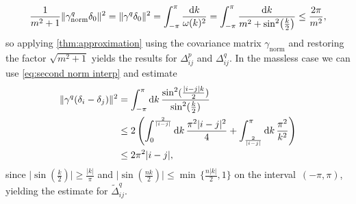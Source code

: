 \documentclass[submission, Phys]{SciPost}
\theoremstyle{definition}
\theoremstyle{remark}
\DeclareMathOperator{\normalized}{norm}
\DeclarePairedDelimiter{\norm}{\lVert}{\rVert}
\renewcommand{\d}{\ensuremath{\mathrm{d}}}
\begin{document}
\begin{appendix}
\begin{equation*}
  \frac1{m^2+1} \norm{\gamma_{\normalized}^q \delta_0}^2 = \norm{\gamma^q \delta_0}^2
= \int_{-\pi}^{\pi}\frac{\d k}{\omega(k)^2}
= \int_{-\pi}^{\pi}\frac{\d k}{m^2 + \sin^2\bigl(\frac{k}{2}\bigr)}
\leq \frac{2\pi}{m^2},
\end{equation*}
so applying \cref{thm:approximation} using the covariance matrix $\gamma_{\normalized}$ and restoring the factor $\sqrt{m^2 + 1}$ yields the results for $\Delta^p_{ij}$ and $\Delta^q_{ij}$.
In the massless case we can use \cref{eq:second norm interp} and estimate
\begin{equation*}\begin{aligned}
\norm{\gamma^q (\delta_i - \delta_j)}^2
&= \int_{-\pi}^{\pi}\d k\, \frac{\sin^2(\frac{\lvert i - j \rvert k}{2})}{\sin^2(\frac{k}{2})} \\
&\leq 2 \left( \int_0^{\frac{2}{\lvert i - j \rvert}} \d k\, \frac{\pi^2 \lvert i - j \rvert^2}{4} + \int_{\frac{2}{\lvert i-j\rvert}}^{\pi}\d k\, \frac{\pi^2}{k^2} \right) \\
&\leq 2\pi^2\lvert i-j\rvert,
\end{aligned}\end{equation*}
since $\lvert\sin(\frac{k}{2})\rvert \geq \frac{\lvert k \rvert}{\pi}$ and $\lvert \sin(\frac{nk}{2}) \rvert \leq \min \, \{\frac{n\lvert k \rvert}{2}, 1\}$ on the interval~$(-\pi,\pi)$, yielding the estimate for $\tilde\Delta^q_{ij}$.


\end{appendix}



\nolinenumbers
\end{document}

